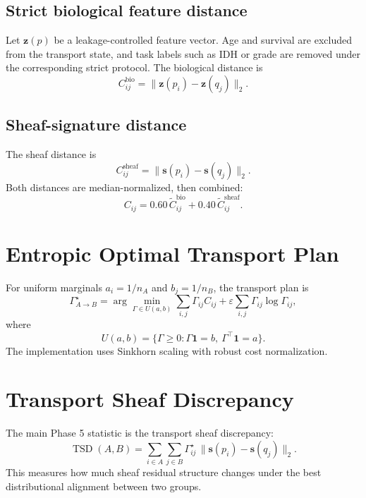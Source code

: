 \documentclass[11pt]{article}
\begin{document}
\subsection{Strict biological feature distance}
Let $\bm{z}(p)$ be a leakage-controlled feature vector.  Age and survival are excluded from the transport state, and task labels such as IDH or grade are removed under the corresponding strict protocol.  The biological distance is
\begin{equation}
C^{\mathrm{bio}}_{ij}=\|\bm{z}(p_i)-\bm{z}(q_j)\|_2.
\end{equation}

\subsection{Sheaf-signature distance}
The sheaf distance is
\begin{equation}
C^{\mathrm{sheaf}}_{ij}=\|\bm{s}(p_i)-\bm{s}(q_j)\|_2.
\end{equation}
Both distances are median-normalized, then combined:
\begin{equation}
C_{ij}=0.60\,\widetilde C^{\mathrm{bio}}_{ij}+0.40\,\widetilde C^{\mathrm{sheaf}}_{ij}.
\end{equation}

\section{Entropic Optimal Transport Plan}
For uniform marginals $a_i=1/n_A$ and $b_j=1/n_B$, the transport plan is
\begin{equation}
\Gamma_{A\to B}^{\star}=\arg\min_{\Gamma\in U(a,b)}
\sum_{i,j}\Gamma_{ij}C_{ij}
+\varepsilon\sum_{i,j}\Gamma_{ij}\log \Gamma_{ij},
\end{equation}
where
\begin{equation}
U(a,b)=\{\Gamma\ge 0: \Gamma\mathbf 1=b,\ \Gamma^{\top}\mathbf 1=a\}.
\end{equation}
The implementation uses Sinkhorn scaling with robust cost normalization.

\section{Transport Sheaf Discrepancy}
The main Phase 5 statistic is the transport sheaf discrepancy:
\begin{equation}
\operatorname{TSD}(A,B)=
\sum_{i\in A}\sum_{j\in B}\Gamma^{\star}_{ij}\,\|\bm{s}(p_i)-\bm{s}(q_j)\|_2.
\end{equation}
This measures how much sheaf residual structure changes under the best distributional alignment between two groups.
\end{document}
